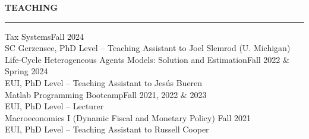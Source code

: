 \documentclass[letterpaper,11pt]{article}
\begin{document}
\vspace{0.5cm}
\textbf{TEACHING}\\
\vspace{1mm} \hrule
\vspace{2mm}
\hspace{0.9cm} Tax Systems\hfill Fall 2024\\ 
\hspace{1.3cm} SC Gerzensee, PhD Level -- Teaching Assistant to Joel Slemrod (U. Michigan)\\ 
\vspace{1mm}
\hspace{0.9cm} Life-Cycle Heterogeneous Agents Models: Solution and Estimation\hfill Fall 2022 \& Spring 2024\\ 
\hspace{1.3cm} EUI, PhD Level -- Teaching Assistant to Jes\'us Bueren\\ 
\vspace{1mm}
\hspace{0.9cm} Matlab Programming Bootcamp\hfill Fall 2021, 2022 \& 2023\\ \vspace{0mm}
\hspace{1.3cm} EUI, PhD Level -- Lecturer\\ 
\vspace{1mm}
\hspace{0.9cm} Macroeconomics I (Dynamic Fiscal and Monetary Policy) \hfill Fall 2021\\ \vspace{0mm}
\hspace{1.3cm} EUI, PhD Level -- Teaching Assistant to Russell Cooper\\
\end{document}

